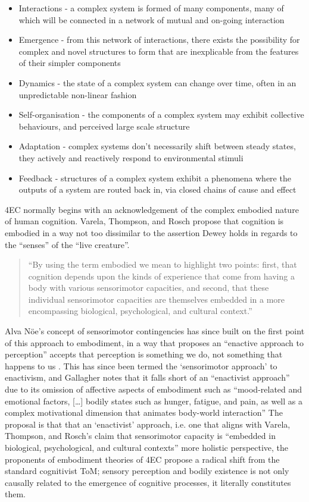 \begin{itemize}
    \item Interactions - a complex system is formed of many components, many of which will be connected in a network of mutual and on-going interaction
    \item Emergence - from this network of interactions, there exists the possibility for complex and novel structures to form that are inexplicable from the features of their simpler components 
    \item Dynamics - the state of a complex system can change over time, often in an unpredictable non-linear fashion
    \item Self-organisation - the components of a complex system may exhibit collective behaviours, and perceived large scale structure
    \item Adaptation - complex systems don’t necessarily shift between steady states, they actively and reactively respond to environmental stimuli
    \item Feedback - structures of a complex system exhibit a phenomena where the outputs of a system are routed back in, via closed chains of cause and effect 
\end{itemize}
4EC normally begins with an acknowledgement of the complex embodied nature of human cognition. Varela, Thompson, and Rosch propose that cognition is embodied in a way not too dissimilar to the assertion Dewey holds in regards to the “senses” of the “live creature”.
\begin{quote}
    “By using the term embodied we mean to highlight two points: first, that cognition depends upon the kinds of experience that come from having a body with various sensorimotor capacities, and second, that these individual sensorimotor capacities are themselves embedded in a more encompassing biological, psychological, and cultural context.” \citeyearpar[pp. 172-173]{varela1993}
\end{quote}
Alva Nöe’s concept of sensorimotor contingencies has since built on the first point of this approach to embodiment, in a way that proposes an “enactive approach to perception” accepts that perception is something we do, not something that happens to us \citep{noe2004}. This has since been termed the ‘sensorimotor approach’ to enactivism, and Gallagher notes that it falls short of an “enactivist approach” due to its omission of affective aspects of embodiment such as “mood-related and emotional factors, […] bodily states such as hunger, fatigue, and pain, as well as a complex motivational dimension that animates body-world interaction”  \citep[p. 150]{gallagher2017} The proposal is that that an ‘enactivist’ approach, i.e. one that aligns with Varela, Thompson, and Rosch’s claim that sensorimotor capacity is “embedded in biological, psychological, and cultural contexts” more holistic perspective, the proponents of embodiment theories of 4EC propose a radical shift from the standard cognitivist ToM; sensory perception and bodily existence is not only causally related to the emergence of cognitive processes, it literally constitutes them. 

